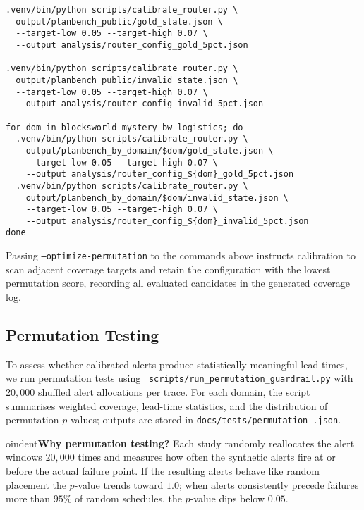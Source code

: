 \documentclass[11pt]{article}
\begin{document}
\begin{lstlisting}[style=stm, caption={Router calibration commands.}, label={lst:calibration}]
.venv/bin/python scripts/calibrate_router.py \
  output/planbench_public/gold_state.json \
  --target-low 0.05 --target-high 0.07 \
  --output analysis/router_config_gold_5pct.json

.venv/bin/python scripts/calibrate_router.py \
  output/planbench_public/invalid_state.json \
  --target-low 0.05 --target-high 0.07 \
  --output analysis/router_config_invalid_5pct.json

for dom in blocksworld mystery_bw logistics; do
  .venv/bin/python scripts/calibrate_router.py \
    output/planbench_by_domain/$dom/gold_state.json \
    --target-low 0.05 --target-high 0.07 \
    --output analysis/router_config_${dom}_gold_5pct.json
  .venv/bin/python scripts/calibrate_router.py \
    output/planbench_by_domain/$dom/invalid_state.json \
    --target-low 0.05 --target-high 0.07 \
    --output analysis/router_config_${dom}_invalid_5pct.json
done
\end{lstlisting}

Passing \texttt{--optimize-permutation} to the commands above instructs
calibration to scan adjacent coverage targets and retain the configuration with
the lowest permutation score, recording all evaluated candidates in the
generated coverage log.

\subsection{Permutation Testing}
\label{subsec:permutation}
To assess whether calibrated alerts produce statistically meaningful lead times,
we run permutation tests using \
\texttt{scripts/run\_permutation\_guardrail.py} with $20{,}000$ shuffled alert
allocations per trace. For each domain, the script summarises weighted coverage,
lead-time statistics, and the distribution of permutation $p$-values; outputs are
stored in \texttt{docs/tests/permutation\_\*.json}.


oindent\textbf{Why permutation testing?} Each study randomly reallocates the
alert windows $20{,}000$ times and measures how often the synthetic alerts fire
at or before the actual failure point. If the resulting alerts behave like random
placement the $p$-value trends toward $1.0$; when alerts consistently precede
failures more than $95\%$ of random schedules, the $p$-value dips below $0.05$.
\end{document}
